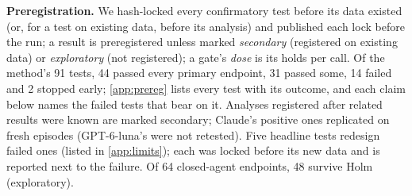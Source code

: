\textbf{Preregistration.} We hash-locked every confirmatory test before its data existed (or, for a test on existing data, before its analysis) and published each lock before the run; a result is preregistered unless marked \emph{secondary} (registered on existing data) or \emph{exploratory} (not registered); a gate's \emph{dose} is its holds per call. Of the method's 91 tests, 44 passed every primary endpoint, 31 passed some, 14 failed and 2 stopped early; \cref{app:prereg} lists every test with its outcome, and each claim below names the failed tests that bear on it. Analyses registered after related results were known are marked secondary; Claude's positive ones replicated on fresh episodes (GPT-6-luna's were not retested). Five headline tests redesign failed ones (listed in \cref{app:limits}); each was locked before its new data and is reported next to the failure. Of 64 closed-agent endpoints, 48 survive Holm (exploratory).
